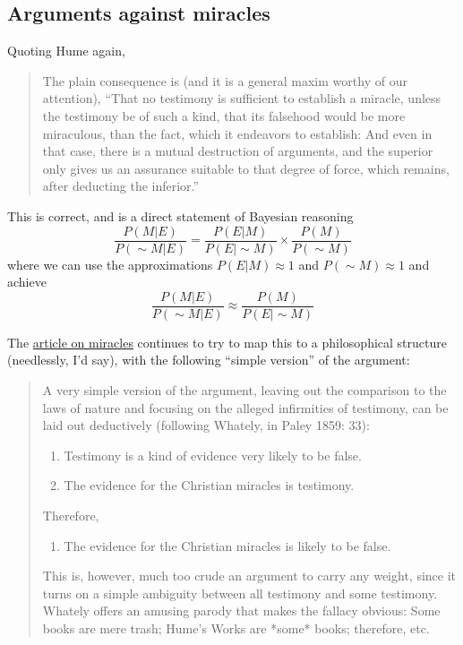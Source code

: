 \documentclass{tufte-book}
\begin{document}
\subsection{Arguments against miracles}\label{arguments-against-miracles}

Quoting Hume again,

\begin{quote}
The plain consequence is (and it is a general maxim worthy of our
attention), ``That no testimony is sufficient to establish a miracle,
unless the testimony be of such a kind, that its falsehood would be more
miraculous, than the fact, which it endeavors to establish: And even in
that case, there is a mutual destruction of arguments, and the superior
only gives us an assurance suitable to that degree of force, which
remains, after deducting the inferior.''
\end{quote}

This is correct, and is a direct statement of Bayesian reasoning \[
\frac{P(M|E)}{P(\sim\!M|E)} =\frac{P(E|M)}{P(E|\sim\!M)} \times\frac{P(M)}{P(\sim\!M)}
\] where we can use the approximations \(P(E|M)\approx 1\) and
\(P(\sim\!M)\approx 1\) and achieve \[
\frac{P(M|E)}{P(\sim\!M|E)} \approx \frac{P(M)}{P(E|\sim\!M)}
\]

The \href{http://plato.stanford.edu/entries/miracles/}{article on
miracles} continues to try to map this to a philosophical structure
(needlessly, I'd say), with the following ``simple version'' of the
argument:

\begin{quote}
A very simple version of the argument, leaving out the comparison to the
laws of nature and focusing on the alleged infirmities of testimony, can
be laid out deductively (following Whately, in Paley 1859: 33):

\begin{enumerate}
\def\labelenumi{\arabic{enumi})}
\item
  Testimony is a kind of evidence very likely to be false.
\item
  The evidence for the Christian miracles is testimony.
\end{enumerate}

Therefore,

\begin{enumerate}
\def\labelenumi{\arabic{enumi})}
\setcounter{enumi}{2}
\itemsep1pt\parskip0pt
\item
  The evidence for the Christian miracles is likely to be false.
\end{enumerate}

This is, however, much too crude an argument to carry any weight, since
it turns on a simple ambiguity between all testimony and some testimony.
Whately offers an amusing parody that makes the fallacy obvious: Some
books are mere trash; Hume's Works are *some* books; therefore, etc.
\end{quote}
\end{document}
